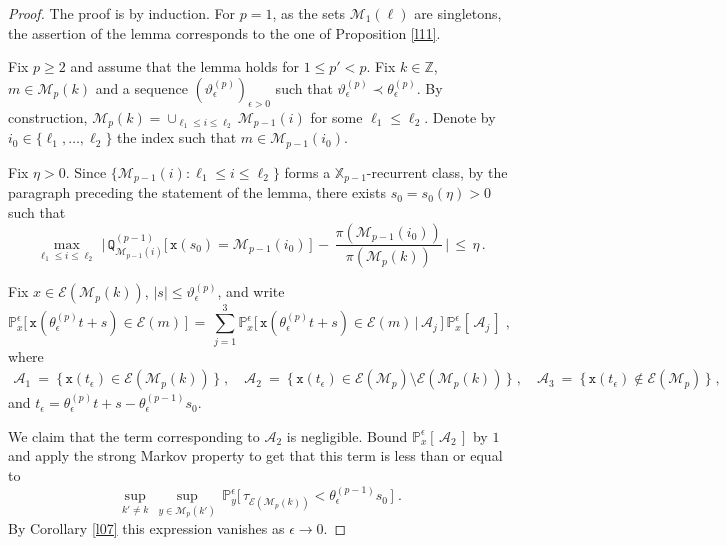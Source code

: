 \documentclass[10pt,a4paper]{amsart}
\newcommand{\bb}[1]{{\mathbb #1}}
\newcommand{\ms}[1]{{\mathscr #1}}
\newcommand{\mtt}[1]{{\mathtt #1}}
\begin{document}
\begin{proof}
The proof is by induction. For $p=1$, as the sets 
$\ms M_1(\ell)$ are singletons, the assertion of the lemma
corresponds to the one of Proposition \ref{l11}.

Fix $p\ge2$ and assume that the lemma holds for $1\le p'<p$.  Fix 
$k\in \bb Z$, $m \in \ms M_p(k)$ and a sequence
$(\vartheta^{(p)}_\epsilon)_{\epsilon>0}$ such that
$\vartheta^{(p)}_\epsilon\prec\theta_{\epsilon}^{(p)}$.  By
construction,
$\ms M_p(k) = \cup_{\ell_1 \le i\le \ell_2} \ms M_{p-1}(i)$ for some
$\ell_1\le\ell_2$. Denote by $i_0 \in \{\ell_1, \dots, \ell_2\}$ the
index such that $m \in \ms M_{p-1}(i_0)$.

Fix $\eta>0$. Since
$\{ \ms M_{p-1}(i) : \ell_1 \le i\le \ell_2\}$ forms a
$\bb X_{p-1}$-recurrent class, by the paragraph preceding the
statement of the lemma, there exists $s_{0}=s_{0}(\eta)>0$ such that
\begin{equation}
\label{93}
\max_{\ell_1 \le i \le \ell_2}\,\Big |\,
\mtt Q_{\ms M_{p-1}(i)}^{(p-1)} \big[\, \mtt x (s_{0}) =
\ms M_{p-1}(i_0)\,\big]
\,-\, \frac{\pi(\ms M_{p-1}(i_0))}{\pi(\ms M_p(k))}\,\Big | \,\le\,
\eta\,.
\end{equation}

Fix $x\in \ms E(\ms M_p(k))$, $|s|\le\vartheta^{(p)}_\epsilon$,
and write
\begin{equation*}
\bb P_x^{\epsilon }\big[\, \mtt x(\theta_{\epsilon}^{(p)}t+s) \in
\ms E(m) \,\big]
\,=\,  \sum_{j=1}^{3} \bb P_x^{\epsilon } \big[\, \mtt x
(\theta_{\epsilon}^{(p)}t+s) \in \ms E(m)
\,\big|\,\mathscr{A}_{j}\,\big]\,
\bb P_x^{\epsilon } [\,\mathscr{A}_{j}\,]\;,
\end{equation*}
where
\begin{gather*}
\mathscr{A}_{1}\ =\ \{\, \mtt x (t_{\epsilon}) \in \ms E(\ms M_{p}(k))
\,\} \;,\quad \mathscr{A}_{2}\ =\ \{\, \mtt x (t_{\epsilon}) \in \ms
E(\ms M_{p}) \setminus \ms E(\ms M_{p}(k)) \,\}\;, \quad
\mathscr{A}_{3}\ =\ \{\, \mtt x (t_{\epsilon})\not\in \ms E(\ms M_{p})
\,\}\;,
\end{gather*}
and $t_{\epsilon}=\theta_{\epsilon}^{(p)}t+s-\theta_{\epsilon}^{(p-1)}s_{0}$.

We claim that the term corresponding to $\mathscr{A}_{2}$ is
negligible.  Bound $\bb P_x^{\epsilon } [\,\mathscr{A}_{2}\,]$ by
$1$ and apply the strong Markov property to get that this term is less
than or equal to
\begin{equation*}
\sup_{k'\neq k}\,\sup_{y\in \ms M_p(k')}\,
\mathbb{P}_{y}^{\epsilon}\big[\,\tau_{\ms E(\ms M_p(k))}
<\theta_{\epsilon}^{(p-1)}s_{0}\,\big]\;.
\end{equation*}
By Corollary \ref{l07} this expression vanishes as $\epsilon\to 0$.


\end{proof}
\end{document}
